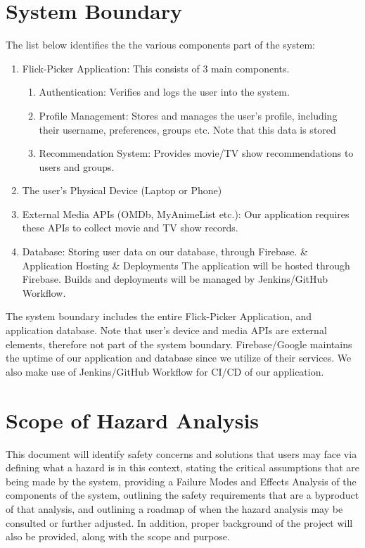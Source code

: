 \documentclass[12pt]{article}
\begin{document}
\section{System Boundary}
The list below identifies the the various components part of the system:
\begin{enumerate}
	\item Flick-Picker Application: This consists of 3 main components.
	\begin{enumerate}
	  \item Authentication: Verifies and logs the user into the system. 
	  \item Profile Management: Stores and manages the user's profile, including their username, preferences, groups etc. Note that this data is stored 
	  \item Recommendation System: Provides movie/TV show recommendations to users and groups.
	\end{enumerate}
	\item The user's Physical Device (Laptop or Phone)
	\item External Media APIs (OMDb, MyAnimeList etc.): Our application requires these APIs to collect movie and TV show records. 
	\item Database: Storing user data on our database, through Firebase. 
	\& Application Hosting \& Deployments The application will be hosted through Firebase. Builds and deployments will be managed by Jenkins/GitHub Workflow.
	\
\end{enumerate}

\noindent The system boundary includes the entire Flick-Picker Application, and application database. Note that user's device and media APIs are external elements, therefore not part of the system boundary. Firebase/Google maintains the uptime of our application and database since we utilize of their services. We also make use of Jenkins/GitHub Workflow for CI/CD of our application. 
	


\section{Scope of Hazard Analysis}
This document will identify safety concerns and solutions that users may face via defining what a hazard is in this context, stating the critical assumptions that are being made by the system, providing a Failure Modes and Effects Analysis of the components of the system, outlining the safety requirements that are a byproduct of that analysis, and outlining a roadmap of when the hazard analysis may be consulted or further adjusted. In addition, proper background of the project will also be provided, along with the scope and purpose.
\end{document}
